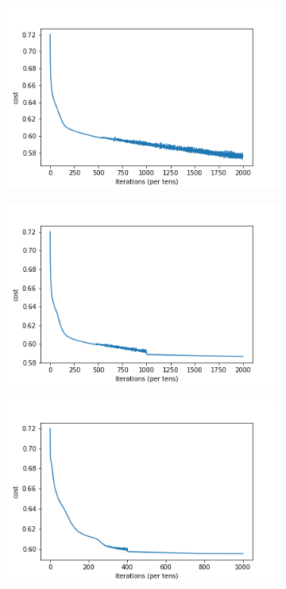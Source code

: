 \documentclass[a4paper,11pt,onecolumn,twoside]{article}
\begin{document}
\begin{figure}[htbp]
	\centering
	\begin{subfigure}[t]{0.31\textwidth}
		\centering
		\includegraphics[width=1.0\textwidth,height=0.18\textheight]{nn3_10000_no.png}
	\end{subfigure}
	\quad
	\begin{subfigure}[t]{0.31\textwidth}
		\centering
		\includegraphics[width=1.0\textwidth,height=0.18\textheight]{nn3_10000.png}
	\end{subfigure}	
	\quad
	\begin{subfigure}[t]{0.31\textwidth}
		\centering
		\includegraphics[width=1.0\textwidth,height=0.18\textheight]{nn5_5000.png}

\end{subfigure}
\end{figure}
\end{document}
